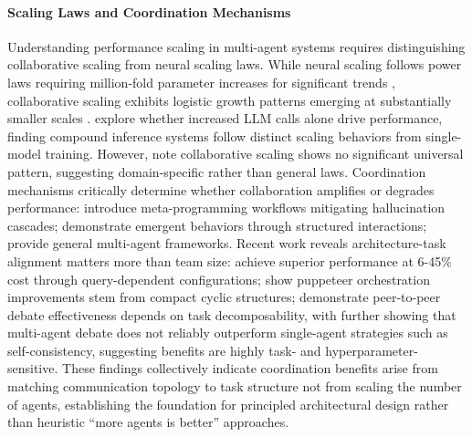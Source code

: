 \paragraph{Scaling Laws and Coordination Mechanisms}

Understanding performance scaling in multi-agent systems requires distinguishing collaborative scaling from neural scaling laws. While neural scaling follows power laws requiring million-fold parameter increases for significant trends \citep{kaplan2020scaling}, collaborative scaling exhibits logistic growth patterns emerging at substantially smaller scales \citep{qian2024scaling}. \citet{chen2024compound} explore whether increased LLM calls alone drive performance, finding compound inference systems follow distinct scaling behaviors from single-model training. However, \citet{wang2024survey} note collaborative scaling shows no significant universal pattern, suggesting domain-specific rather than general laws. Coordination mechanisms critically determine whether collaboration amplifies or degrades performance: \citet{hong2024metagpt} introduce meta-programming workflows mitigating hallucination cascades; \citet{chen2023agentverse} demonstrate emergent behaviors through structured interactions; \citet{wu2024autogen} provide general multi-agent frameworks. Recent work reveals architecture-task alignment matters more than team size: \citet{zhang2025maas} achieve superior performance at 6-45\% cost through query-dependent configurations; \citet{dang2025evolving} show puppeteer orchestration improvements stem from compact cyclic structures; \citet{du2023improving} demonstrate peer-to-peer debate effectiveness depends on task decomposability, with \citet{smit2023should} further showing that multi-agent debate does not reliably outperform single-agent strategies such as self-consistency, suggesting benefits are highly task- and hyperparameter-sensitive. These findings collectively indicate coordination benefits arise from matching communication topology to task structure not from scaling the number of agents, establishing the foundation for principled architectural design rather than heuristic ``more agents is better'' approaches.